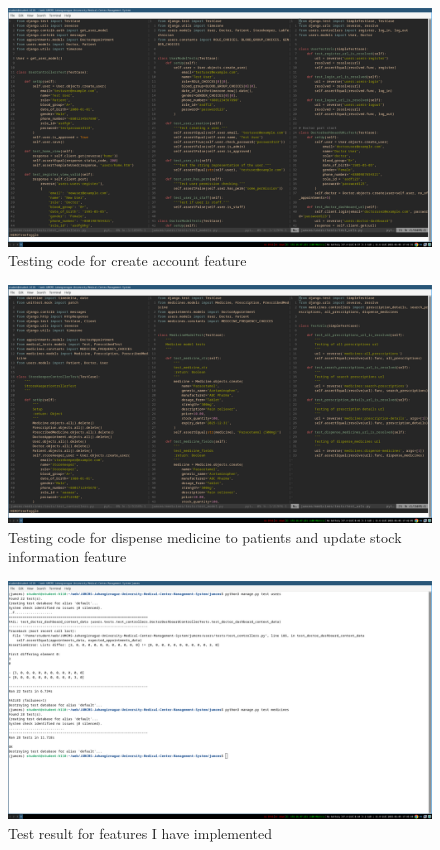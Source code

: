 \documentclass[a4paper,12pt]{article}
\begin{document}
\begin{figure}[H]
    \centering
    \includegraphics[width=1\textwidth]{images/TDD1.png}
    \caption{Testing code for create account feature}
    \label{fig:tdd1}
\end{figure}
\begin{figure}[H]
    \centering
    \includegraphics[width=1\textwidth]{images/TDD2.png}
    \caption{Testing code for dispense medicine to patients and update stock information feature}
    \label{fig:tdd2}
\end{figure}
\begin{figure}[H]
    \centering
    \includegraphics[width=1\textwidth]{images/TDD3.png}
    \caption{Test result for features I have implemented}
    \label{fig:tdd3}
\end{figure}
\end{document}

